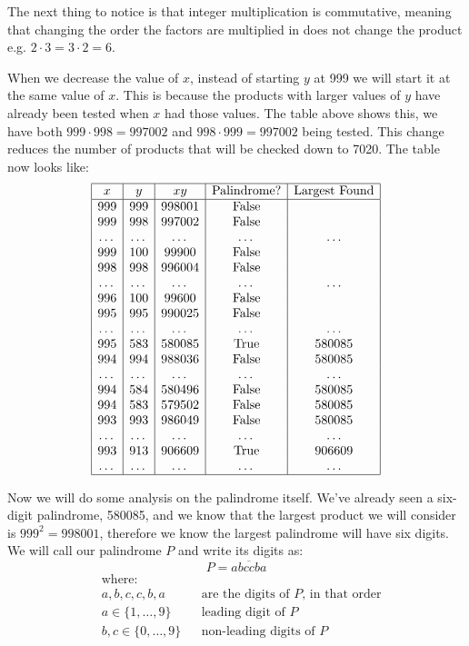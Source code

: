 \documentclass{article}
\begin{document}
The next thing to notice is that integer multiplication is commutative, meaning that changing the order the factors are multiplied in does not change the product e.g. \(2\cdot3 = 3\cdot2 = 6\).

When we decrease the value of \(x\), instead of starting \(y\) at 999 we will start it at the same value of \(x\). This is because the products with larger values of \(y\) have already been tested when \(x\) had those values. The table above shows this, we have both \(999\cdot998=997002\) and \(998\cdot999=997002\) being tested. This change reduces the number of products that will be checked down to 7020. The table now looks like:
\[\begin{array}{|c|c|c|c|c|}
    \hline
    x & y & xy & \text{Palindrome?} & \text{Largest Found} \\
    \hline
    999 & 999 & 998001 & \text{False} & \\
    999 & 998 & 997002 & \text{False} & \\
    \dots & \dots & \dots & \dots & \dots \\
    999 & 100 & 99900 & \text{False} & \\
    998 & 998 & 996004 & \text{False} & \\
    \dots & \dots & \dots & \dots & \dots \\
    996 & 100 & 99600 & \text{False} & \\
    995 & 995 & 990025 & \text{False} & \\
    \dots & \dots & \dots & \dots & \dots \\
    995 & 583 & 580085 & \text{True} & 580085 \\
    994 & 994 & 988036 & \text{False} & 580085 \\
    \dots & \dots & \dots & \dots & \dots \\
    994 & 584 & 580496 & \text{False} & 580085 \\
    994 & 583 & 579502 & \text{False} & 580085 \\
    993 & 993 & 986049 & \text{False} & 580085 \\
    \dots & \dots & \dots & \dots & \dots \\
    993 & 913 & 906609 & \text{True} & 906609 \\
    \dots & \dots & \dots & \dots & \dots \\
    \hline
\end{array}\]

Now we will do some analysis on the palindrome itself. We've already seen a six-digit palindrome, 580085, and we know that the largest product we will consider is \(999^2 = 998001\), therefore we know the largest palindrome will have six digits. We will call our palindrome \(P\) and write its digits as:
\[P = \overline{abccba} \]
\[ \begin{aligned}
    & \text{where:} \\
    & a, b, c, c, b, a && \text{are the digits of \(P\), in that order} \\
    & a \in \{1, \dots, 9\} && \text{leading digit of \(P\)} \\
    & b,c \in \{0, \dots, 9\} && \text{non-leading digits of \(P\)}
\end{aligned} \]
\end{document}
